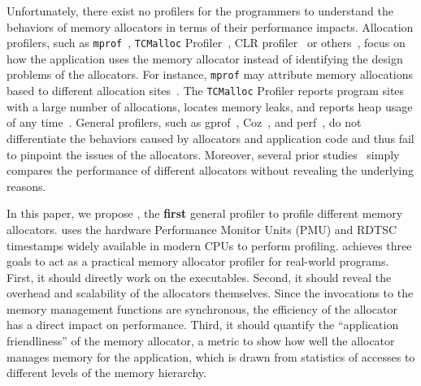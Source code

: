 Unfortunately, there exist no profilers for the programmers to understand the behaviors of memory allocators in terms of their performance impacts. Allocation profilers, such as \texttt{mprof}~\cite{Zorn:1988:MAP:894814}, \texttt{TCMalloc} Profiler~\cite{tcmalloc-profiler}, CLR profiler~\cite{lupasc2014dynamic} or others~\cite{hirotaka2003developing}, focus on how the application uses the memory allocator instead of identifying the design problems of the allocators. For instance, \texttt{mprof} may attribute memory allocations based to different allocation sites~\cite{Zorn:1988:MAP:894814}. The \texttt{TCMalloc} Profiler reports program sites with a large number of allocations, locates memory leaks, and reports heap usage of any time~\cite{tcmalloc-profiler}. General profilers, such as gprof~\cite{DBLP:conf/sigplan/GrahamKM82}, Coz~\cite{Coz}, and perf~\cite{perf}, do not differentiate the behaviors caused by allocators and application code and thus fail to pinpoint the issues of the allocators. Moreover, several prior studies~\cite{Barroso:1998:MSC:279358.279363, Masmano:2006:CMA:1167999.1168012, ferreira2011experimental} simply compares the performance of different allocators without revealing the underlying reasons. 


In this paper, we propose \MP{}, the \textbf{first} general profiler to profile different memory allocators. \MP{} uses the hardware Performance Monitor Units (PMU) and RDTSC timestamps widely available in modern CPUs to perform profiling. \MP{} achieves three goals to act as a practical memory allocator profiler for real-world programs. First, it should directly work on the executables. Second, it should reveal the overhead and scalability of the allocators themselves. Since the invocations to the memory management functions are synchronous, the efficiency of the allocator has a direct impact on performance. Third, it should quantify the ``application friendliness'' of the memory allocator, a metric to show how well the allocator manages memory for the application, which is drawn from statistics of accesses to different levels of the memory hierarchy.

